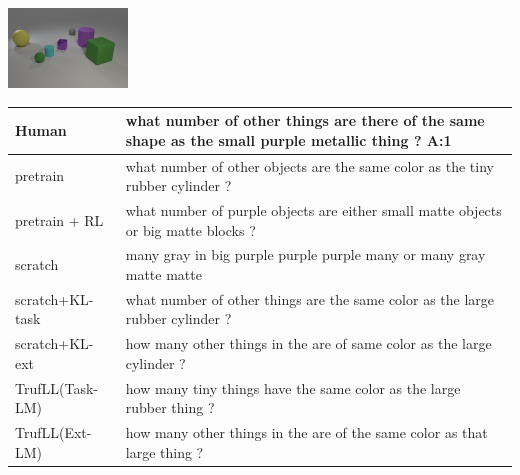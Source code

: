 \documentclass{article}
\newcommand{\algo}{TrufLL\xspace}
\begin{document}
\begin{table}[h!]
  \begin{minipage}{0.2\linewidth}
        \includegraphics[width=120px]{./CLEVR_val_004953.png}
	\end{minipage}
	 \hspace{1.2cm}
	\begin{minipage}{0.80\linewidth}
		\scriptsize
		\begin{tabular}{ll}
			Human           & what number of other things are there of the same shape as the small purple metallic thing ?  \quad \textbf{A:1} \\
			\midrule
			pretrain        & what number of other objects are the same color as the tiny rubber cylinder ? \\
		    pretrain + RL   & what number of purple objects are either small matte objects or big matte blocks ? \\ \midrule
			scratch         & many gray in big purple purple purple many or many gray matte matte  \\
			scratch+KL-task & what number of other things are the same color as the large rubber cylinder ? \\
			scratch+KL-ext  & how many other things in the are of same color as the large cylinder ?\\ \midrule
			\algo(Task-LM) & how many tiny things have the same color as the large rubber thing ? \\
			\algo(Ext-LM)   & how many other things in the are of the same color as that large thing ? \\
			\bottomrule
		\end{tabular}
	\end{minipage}
	\vspace{1mm}


\end{table}
\end{document}
